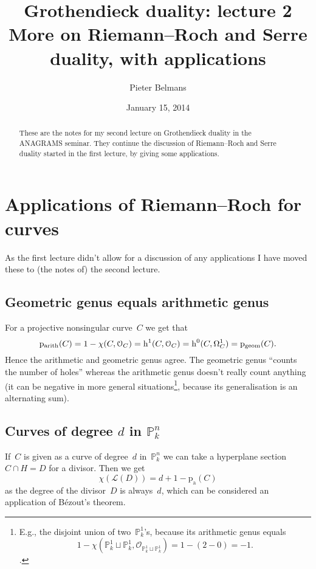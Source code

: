 \documentclass[10pt,a4paper]{article}
\title{Grothendieck duality: lecture 2 \\[.2em] \Large More on Riemann--Roch and Serre duality, with applications}
\author{Pieter Belmans}
\date{January 15, 2014}
\begin{document}
\maketitle

\begin{abstract}
  These are the notes for my second lecture on Grothendieck duality in the ANAGRAMS seminar. They continue the discussion of Riemann--Roch and Serre duality started in the first lecture, by giving some applications.
\end{abstract}

\tableofcontents

\clearpage

\section{Applications of Riemann--Roch for curves}
\label{section:applications-curves}
As the first lecture didn't allow for a discussion of any applications I have moved these to (the notes of) the second lecture.

\subsection{Geometric genus equals arithmetic genus}
For a projective nonsingular curve~$C$ we get that
\begin{equation}
  \mathrm{p}_{\mathrm{arith}}(C)=1-\chi(C,\mathcal{O}_C)=\operatorname{h}^1(C,\mathcal{O}_C)=\operatorname{h}^0(C,\Omega_C^1)=\mathrm{p}_{\mathrm{geom}}(C).
\end{equation}
Hence the arithmetic and geometric genus agree. The geometric genus ``counts the number of holes'' whereas the arithmetic genus doesn't really count anything (it can be negative in more general situations\footnote{E.g., the disjoint union of two~$\mathbb{P}_k^1$'s, because its arithmetic genus equals\begin{equation}1-\chi(\mathbb{P}_k^1\sqcup\mathbb{P}_k^1,\mathcal{O}_{\mathbb{P}_k^1\sqcup\mathbb{P}_k^1})=1-(2-0)=-1.\end{equation}.}, because its generalisation is an alternating sum).

\subsection{Curves of degree \texorpdfstring{$d$}{d} in \texorpdfstring{$\mathbb{P}_k^n$}{n-dimensional projective space}}
If~$C$ is given as a curve of degree~$d$ in~$\mathbb{P}_k^n$ we can take a hyperplane section~$C\cap H=D$ for a divisor. Then we get
\begin{equation}
  \chi(\mathcal{L}(D))=d+1-\mathrm{p}_{\mathrm{a}}(C)
\end{equation}
as the degree of the divisor~$D$ is always~$d$, which can be considered an application of B\'ezout's theorem.
\end{document}
